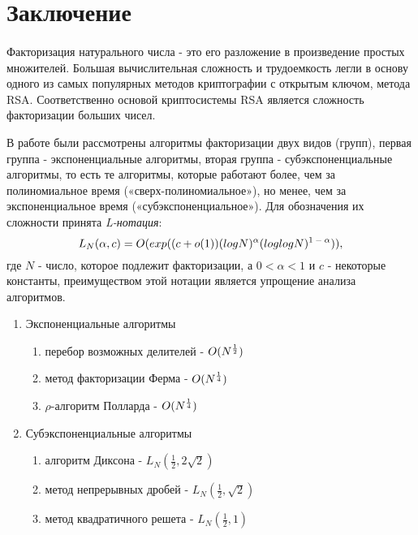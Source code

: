   
\section{Заключение}

\paragraph{} Факторизация натурального числа - это его разложение в произведение простых множителей. Большая вычислительная сложность и трудоемкость легли в основу одного из самых популярных методов криптографии с открытым ключом, метода RSA. Соответственно основой криптосистемы RSA является сложность факторизации больших чисел.
  
  В работе были рассмотрены алгоритмы факторизации двух видов (групп), первая группа - экспоненциальные 
  алгоритмы, вторая группа - субэкспоненциальные алгоритмы, то есть те алгоритмы, которые работают более, чем за полиномиальное время («сверх-полиномиальное»),
  но менее, чем за экспоненциальное время («субэкспоненциальное»). Для обозначения их сложности принята \textit{L-нотация}:  
    \begin{equation} \label{eq:prime-fact-lnc}
     L_N(\alpha,c)=O(exp((c+o(1))(logN)^\alpha(loglogN)\textsuperscript{{$1-\alpha$}})), 
    \end{equation}    
  где {$N$} - число, которое подлежит факторизации, а {$0 < \alpha < 1$} и {$c$} - некоторые константы, преимуществом этой нотации является упрощение 
  анализа алгоритмов.
  
    \begin{enumerate}
     \item Экспоненциальные алгоритмы
     
    	\begin{enumerate}
    	 \item перебор возможных делителей - {$O(N\textsuperscript{{$\frac{1}{2}$}})$}
    	 \item метод факторизации Ферма - {$O(N\textsuperscript{{$\frac{1}{4}$}})$}
    	 \item {$\rho$}-алгоритм Полларда - {$O(N\textsuperscript{{$\frac{1}{4}$}})$}
    	\end{enumerate}
     
     \item Субэкспоненциальные алгоритмы
     
    	\begin{enumerate}
    	 \item алгоритм Диксона - {$L_N(\frac{1}{2}, 2\sqrt{2})$}
    	 \item метод непрерывных дробей - {$L_N(\frac{1}{2}, \sqrt{2})$}
    	 \item метод квадратичного решета - {$L_N(\frac{1}{2}, 1)$}	
    	\end{enumerate}

    \end{enumerate}
    
